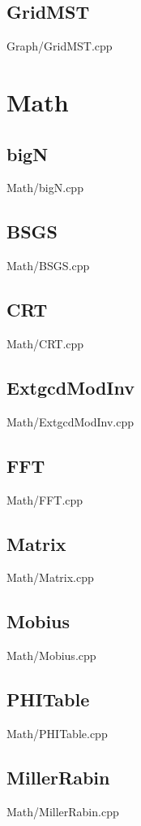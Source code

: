     \subsection{GridMST}
         {Graph/GridMST.cpp}

\section{Math}
    \subsection{bigN}
         {Math/bigN.cpp}
    \subsection{BSGS}
         {Math/BSGS.cpp}
    \subsection{CRT}
         {Math/CRT.cpp}
    \subsection{ExtgcdModInv}
         {Math/ExtgcdModInv.cpp}
    \subsection{FFT}
         {Math/FFT.cpp}
    \subsection{Matrix}
         {Math/Matrix.cpp}
    \subsection{Mobius}
         {Math/Mobius.cpp}
    \subsection{PHITable}
         {Math/PHITable.cpp}
    \subsection{MillerRabin}
         {Math/MillerRabin.cpp}
